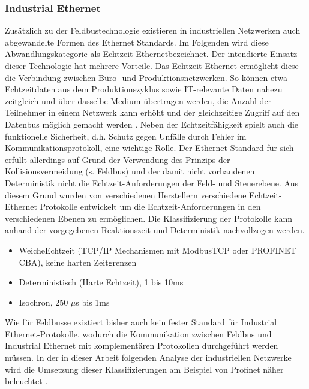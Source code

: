 \subsubsection{Industrial Ethernet}
Zusätzlich zu der Feldbustechnologie existieren in industriellen Netzwerken auch abgewandelte Formen des Ethernet Standards. Im Folgenden wird diese Abwandlungskategorie als \glqq Echtzeit-Ethernet\grqq  bezeichnet. Der intendierte Einsatz dieser Technologie hat mehrere Vorteile. Das Echtzeit-Ethernet ermöglicht diese die Verbindung zwischen Büro- und Produktionsnetzwerken. So können etwa Echtzeitdaten aus dem Produktionszyklus sowie IT-relevante Daten nahezu zeitgleich und über dasselbe Medium übertragen werden, die Anzahl der Teilnehmer in einem Netzwerk kann erhöht und der gleichzeitige Zugriff auf den Datenbus möglich gemacht werden \citep{IndEth1}. %
Neben der Echtzeitfähigkeit spielt auch die funktionelle Sicherheit, d.h. Schutz gegen Unfälle durch Fehler im Kommunikationsprotokoll, eine wichtige Rolle\citep{Pereira2009}. %
Der Ethernet-Standard für sich erfüllt allerdings auf Grund der Verwendung des Prinzips der Kollisionsvermeidung (s. Feldbus) und der damit nicht vorhandenen Deterministik nicht die Echtzeit-Anforderungen der Feld- und Steuerebene.
Aus diesem Grund wurden von verschiedenen Herstellern verschiedene Echtzeit-Ethernet Protokolle entwickelt um die Echtzeit-Anforderungen in den verschiedenen Ebenen zu ermöglichen. 
Die Klassifizierung der Protokolle kann anhand der vorgegebenen Reaktionszeit und Deterministik nachvollzogen werden.
\begin{itemize}
\item \glqq Weiche\grqq  Echtzeit (TCP/IP Mechanismen mit ModbusTCP oder PROFINET CBA), keine harten Zeitgrenzen
\item Deterministisch (Harte Echtzeit), 1 bis 10ms
\item Isochron, 250 $\mu $s bis 1ms
\end{itemize}
\citep{Pereira2009}

Wie für Feldbusse existiert bisher auch kein fester Standard für Industrial Ethernet-Protokolle, wodurch die Kommunikation zwischen Feldbus und Industrial Ethernet mit komplementären Protokollen durchgeführt werden müssen. In der in dieser Arbeit folgenden Analyse der industriellen Netzwerke wird die Umsetzung dieser Klassifizierungen am Beispiel von Profinet näher beleuchtet \citep{IndEth3}. %

